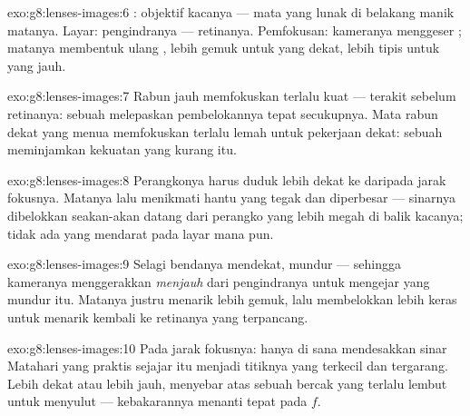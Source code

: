 \begin{solution}{exo:g8:lenses-images:6}
:  objektif kacanya ---  mata yang lunak di belakang
manik matanya. Layar: pengindranya --- retinanya. Pemfokusan: kameranya
menggeser ; matanya membentuk ulang , lebih gemuk
untuk yang dekat, lebih tipis untuk yang jauh.
\end{solution}

\begin{solution}{exo:g8:lenses-images:7}
Rabun jauh memfokuskan terlalu kuat ---  terakit sebelum
retinanya: sebuah  melepaskan pembelokannya tepat
secukupnya. Mata rabun dekat yang menua memfokuskan terlalu lemah
untuk pekerjaan dekat: sebuah  meminjamkan kekuatan yang
kurang itu.
\end{solution}

\begin{solution}{exo:g8:lenses-images:8}
Perangkonya harus duduk lebih dekat ke  daripada jarak
fokusnya. Matanya lalu menikmati hantu yang tegak dan diperbesar ---
sinarnya dibelokkan seakan-akan datang dari perangko yang lebih megah
di balik kacanya; tidak ada yang mendarat pada layar mana pun.
\end{solution}

\begin{solution}{exo:g8:lenses-images:9}
Selagi bendanya mendekat,  mundur --- sehingga kameranya
menggerakkan  \emph{menjauh} dari pengindranya untuk mengejar
 yang mundur itu. Matanya justru menarik  lebih gemuk,
lalu membelokkan lebih keras untuk menarik  kembali ke
retinanya yang terpancang.
\end{solution}

\begin{solution}{exo:g8:lenses-images:10}
Pada jarak fokusnya: hanya di sana  mendesakkan sinar Matahari
yang praktis sejajar itu menjadi titiknya yang terkecil dan tergarang.
Lebih dekat atau lebih jauh,  menyebar atas sebuah bercak
yang terlalu lembut untuk menyulut --- kebakarannya menanti tepat pada
$f$.
\end{solution}

